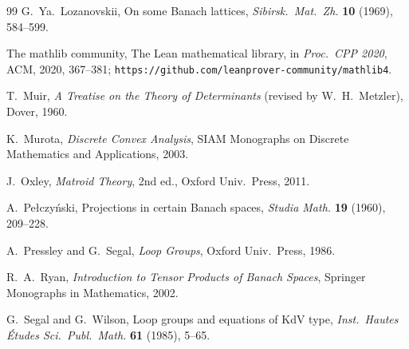 \documentclass[11pt]{amsart}
\theoremstyle{definition}
\begin{document}
\begin{thebibliography}{99}
 G.~Ya.~Lozanovskii, On some Banach lattices, \emph{Sibirsk.\ Mat.\ Zh.} \textbf{10} (1969), 584--599.

 The mathlib community, The Lean mathematical library, in \emph{Proc.\ CPP 2020}, ACM, 2020, 367--381; \texttt{https://github.com/leanprover-community/mathlib4}.

 T.~Muir, \emph{A Treatise on the Theory of Determinants} (revised by W.~H.~Metzler), Dover, 1960.

 K.~Murota, \emph{Discrete Convex Analysis}, SIAM Monographs on Discrete Mathematics and Applications, 2003.

 J.~Oxley, \emph{Matroid Theory}, 2nd ed., Oxford Univ.\ Press, 2011.

 A.~Pe\l czy\'nski, Projections in certain Banach spaces, \emph{Studia Math.} \textbf{19} (1960), 209--228.

 A.~Pressley and G.~Segal, \emph{Loop Groups}, Oxford Univ.\ Press, 1986.

 R.~A.~Ryan, \emph{Introduction to Tensor Products of Banach Spaces}, Springer Monographs in Mathematics, 2002.

 G.~Segal and G.~Wilson, Loop groups and equations of KdV type, \emph{Inst.\ Hautes \'Etudes Sci.\ Publ.\ Math.} \textbf{61} (1985), 5--65.

\end{thebibliography}
\end{document}
